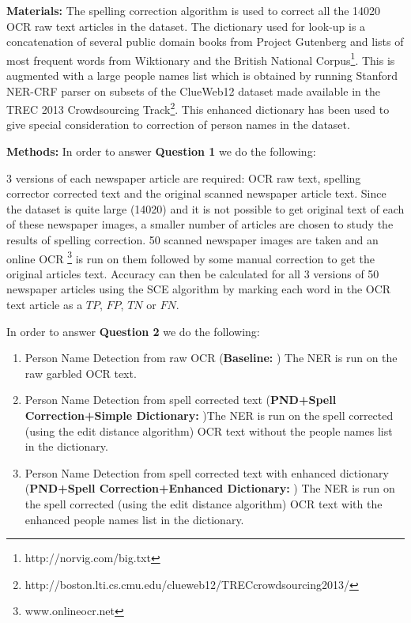 \documentclass[12pt]{article}
\begin{document}
\noindent \textbf{Materials: }
The spelling correction algorithm is used to correct all the 14020 OCR raw text articles in the dataset. The dictionary used for look-up is a concatenation of several public domain books from Project Gutenberg and lists of most frequent words from Wiktionary and the British National Corpus\footnote{http://norvig.com/big.txt}. This is augmented with a large people names list which is obtained  by running Stanford NER-CRF parser on subsets of the ClueWeb12 dataset made available in the TREC 2013 Crowdsourcing Track\footnote{http://boston.lti.cs.cmu.edu/clueweb12/TRECcrowdsourcing2013/}. This enhanced dictionary has been used to give special consideration to correction of person names in the dataset.

\noindent \textbf{Methods: }
In order to answer \textbf{Question 1} we do the following: 

3 versions of each newspaper article are required: OCR raw text, spelling corrector corrected text and the original scanned newspaper article text. Since the dataset is quite large (14020) and it is not possible to get original text of each of these newspaper images, a smaller number of articles are chosen to study the results of spelling correction. 50 scanned newspaper images are taken and an online OCR \footnote{www.onlineocr.net} is run on them followed by some manual correction to get the original articles text. Accuracy can then be calculated for all 3 versions of 50 newspaper articles using the SCE algorithm by marking each word in the OCR text article as a $TP$, $FP$, $TN$ or $FN$. 

In order to answer \textbf{Question 2} we do the following: 
\begin{enumerate}
\item Person Name Detection from raw OCR (\textbf{Baseline: }) The NER is run on the raw garbled OCR text.
\item Person Name Detection from spell corrected text (\textbf{PND+Spell Correction+Simple Dictionary: })The NER is run on the spell corrected (using the edit distance algorithm) OCR text without the people names list in the dictionary.
\item Person Name Detection from spell corrected text with enhanced dictionary (\textbf{PND+Spell Correction+Enhanced Dictionary: }) The NER is run on the spell corrected (using the edit distance algorithm) OCR text with the enhanced people names list in the dictionary.

\end{enumerate}
\end{document}

